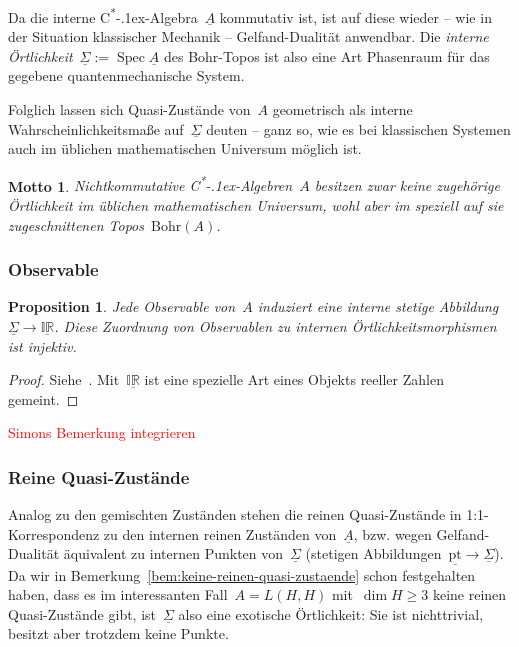 \documentclass[a4paper,ngerman,12pt]{scrartcl}
\theoremstyle{definition}
\theoremstyle{plain}
\newtheorem{prop}[defn]{Proposition}
\newtheorem{motto}[defn]{Motto}
\theoremstyle{remark}
\newcommand{\Bohr}{\mathrm{Bohr}}
\newcommand{\pt}{\mathrm{pt}}
\newcommand{\ul}[1]{\underline{#1}}
\newcommand{\csalgebra}{C\textsuperscript{*}\kern-.1ex-Algebra}
\newcommand{\csalgebren}{C\textsuperscript{*}\kern-.1ex-Alge\-bren}
\DeclareMathOperator{\Spec}{Spec}
\renewcommand{\_}{\mathpunct{.}\,}
\newcommand{\?}{\,{:}\,}
\newcommand{\XXX}[1]{\textcolor{red}{#1}}
\begin{document}
Da die interne \csalgebra~$\ul{A}$ kommutativ ist, ist auf diese wieder -- wie
in der Situation klassischer Mechanik -- Gelfand-Dualität anwendbar. Die
\emph{interne Örtlichkeit}~$\ul{\Sigma} := \Spec \ul{A}$ des Bohr-Topos ist
also eine Art Phasenraum für das gegebene quantenmechanische System.

Folglich lassen sich Quasi-Zustände von~$A$ geometrisch als interne
Wahrscheinlichkeitsmaße auf~$\ul{\Sigma}$ deuten -- ganz so, wie es bei
klassischen Systemen auch im üblichen mathematischen Universum möglich ist.

\begin{motto}Nichtkommutative \csalgebren~$A$ besitzen zwar keine zugehörige
Örtlichkeit im üblichen mathematischen Universum, wohl aber im speziell auf sie
zugeschnittenen Topos~$\Bohr(A)$.\end{motto}


\subsubsection*{Observable}

\begin{prop}Jede Observable von~$A$ induziert eine interne stetige
Abbildung~$\ul{\Sigma} \to \ul{\mathbb{IR}}$. Diese Zuordnung von Observablen
zu internen Örtlichkeitsmorphismen ist
injektiv.\end{prop}
\begin{proof}Siehe~\cite[Prop.~15]{topos:aqt}. Mit~$\ul{\mathbb{IR}}$ ist eine
spezielle Art eines Objekts reeller Zahlen gemeint.\end{proof}

\XXX{Simons Bemerkung integrieren}


\subsubsection*{Reine Quasi-Zustände}

Analog zu den gemischten Zuständen stehen die reinen Quasi-Zustände in
1:1-Kor\-res\-pon\-denz zu 
den internen reinen Zuständen von~$\ul{A}$, bzw. wegen Gelfand-Dualität
äquivalent zu internen Punkten von~$\ul{\Sigma}$ (stetigen
Abbildungen~$\ul{\pt} \to \ul{\Sigma}$). Da wir in
Bemerkung~\ref{bem:keine-reinen-quasi-zustaende} schon festgehalten haben, dass es im
interessanten Fall~$A = L(H,H)$ mit~$\dim H \geq 3$ keine reinen Quasi-Zustände
gibt, ist~$\ul{\Sigma}$ also eine exotische Örtlichkeit: Sie ist nichttrivial,
besitzt aber trotzdem keine Punkte.
\end{document}
